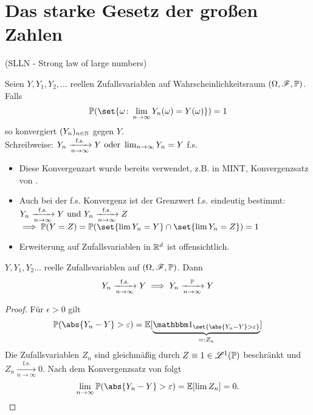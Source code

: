 \section{Das starke Gesetz der großen Zahlen}
(SLLN - Strong law of large numbers)\\
\begin{definition}
	Seien $Y,Y_1, Y_2, \dots$ reellen Zufallsvariablen auf Wahrscheinlichkeitsraum $(\O,\F,\P)$. Falls
	\begin{align*}
		\P(\set{\omega\colon \lim_{n\to \infty} Y_n(\omega) = Y(\omega)}) = 1
	\end{align*}
	so konvergiert $(Y_n)_{n\in \N}$  gegen $Y$.\\
	Schreibweise: $Y_n \xrightarrow[n \to \infty]{\text{f.s.}} Y \oder \lim_{n\to \infty} Y_n = Y$ f.s.
\end{definition}
\begin{*remark}
	\begin{itemize}
		\item Diese Konvergenzart wurde bereits verwendet, z.B. in MINT, Konvergenzsatz von .
		\item Auch bei der f.s. Konvergenz ist der Grenzwert f.s. eindeutig bestimmt:\\
		$Y_n \xrightarrow[n \to \infty]{\text{f.s.}}Y \und Y_n \xrightarrow[n \to \infty]{\text{f.s.}}Z$
		$\implies \P(Y=Z) = \P(\set{\lim Y_n = Y} \cap \set{\lim Y_n = Z}) = 1$
		\item Erweiterung auf Zufallsvariablen in $\Rd$ ist offensichtlich.
	\end{itemize}
\end{*remark}
\begin{lemma}
	$Y,Y_1,Y_2 \dots$ reelle Zufallsvariablen auf $(\O,\F,\P)$. Dann
	\begin{align*}
		Y_n \xrightarrow[n \to \infty]{\text{f.s.}} Y \implies Y_n \xrightarrow[n \to \infty]{\P} Y
	\end{align*}
\end{lemma}
\begin{proof}
	Für $\epsilon > 0$ gilt
	\begin{align*}
		\P(\abs{Y_n - Y} > \epsilon) = \E[\underbrace{\indi_{\set{\abs{Y_n - Y}> \epsilon}}}_{=: Z_n}]
	\end{align*}
	Die Zufallsvariablen $Z_n$ sind gleichmäßig durch $Z \equiv 1 \in \Ln{1}(\P)$ beschränkt und $Z_n \xrightarrow[n \to \infty]{\text{f.s.}} 0$. Nach dem Konvergenzsatz von  folgt
	\begin{align*}
		\lim_{n\to \infty} \P(\abs{Y_n - Y}> \epsilon) = \E[\lim Z_n] = 0.
	\end{align*}
\end{proof}
